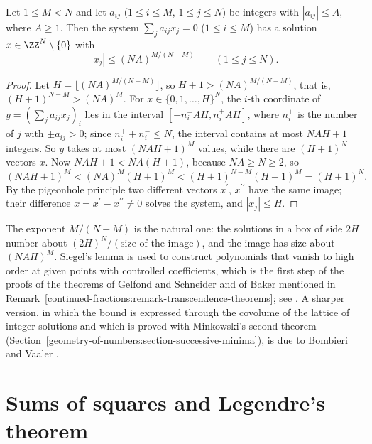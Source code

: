 \begin{theorem}\label{geometry-of-numbers:theorem-siegel}
Let $1 \leq M < N$ and let $a_{ij}$ ($1 \leq i \leq M$, $1 \leq j \leq N$) be integers with $|a_{ij}| \leq A$, where $A \geq 1$. Then the system $\sum_ja_{ij}x_j = 0$ ($1 \leq i \leq M$) has a solution
$x \in \ZZ^N \setminus \{0\}$ with
\[
|x_j| \leq (NA)^{M/(N-M)} \qquad (1 \leq j \leq N).
\]
\end{theorem}

\begin{proof}
Let $H = \lfloor(NA)^{M/(N-M)}\rfloor$, so $H + 1 > (NA)^{M/(N-M)}$, that is, $(H + 1)^{N-M} > (NA)^M$. For $x \in \{0, 1, \ldots, H\}^N$, the $i$-th coordinate of $y = (\sum_ja_{ij}x_j)_i$ lies in
the interval $[-n_i^-AH, n_i^+AH]$, where $n_i^\pm$ is the number of $j$ with $\pm a_{ij} > 0$; since $n_i^+ + n_i^- \leq N$, the interval contains at most $NAH + 1$ integers. So $y$ takes at most
$(NAH + 1)^M$ values, while there are $(H + 1)^N$ vectors $x$. Now $NAH + 1 < NA(H + 1)$, because $NA \geq N \geq 2$, so
\[
(NAH + 1)^M < (NA)^M(H + 1)^M < (H + 1)^{N-M}(H + 1)^M = (H + 1)^N.
\]
By the pigeonhole principle two different vectors $x^{\prime}$, $x^{\prime\prime}$ have the same image; their difference $x = x^{\prime} - x^{\prime\prime} \neq 0$ solves the system, and
$|x_j| \leq H$.
\end{proof}

\begin{remark}\label{geometry-of-numbers:remark-siegel}
The exponent $M/(N - M)$ is the natural one: the solutions in a box of side $2H$ number about $(2H)^N/(\text{size of the image})$, and the image has size about $(NAH)^M$. Siegel's lemma is used to
construct polynomials that vanish to high order at given points with controlled coefficients, which is the first step of the proofs of the theorems of Gelfond and Schneider and of Baker
mentioned in Remark~\ref{continued-fractions:remark-transcendence-theorems}; see \cite{baker-transcendental}. A sharper version, in which the bound is expressed through the covolume of the lattice of integer
solutions and which is proved with Minkowski's second theorem (Section~\ref{geometry-of-numbers:section-successive-minima}), is due to Bombieri and Vaaler \cite{bombieri-vaaler}.
\end{remark}

\section{Sums of squares and Legendre's theorem}\label{geometry-of-numbers:section-squares}

